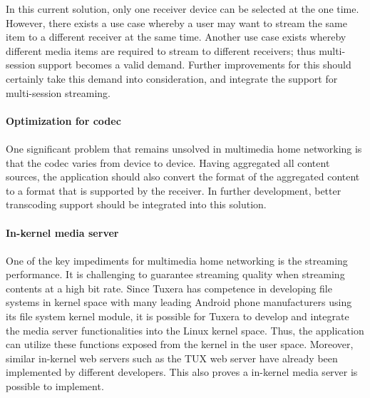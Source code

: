 In this current solution, only one receiver device can be selected at the one
time. However, there exists a use case whereby a user may want to stream the
same item to a different receiver at the same time. Another use case exists
whereby different media items are required to stream to different receivers;
thus multi-session support becomes a valid demand. Further improvements
for this should certainly take this demand into consideration, and integrate the
support for multi-session streaming.\\
\\
\textbf{Optimization for codec}\\
\\
One significant problem that remains unsolved in multimedia home networking is
that the codec varies from device to device. Having aggregated all content
sources, the application should also convert the format of the aggregated
content to a format that is supported by the receiver. In further development,
better transcoding support should be integrated into this solution.\\
\\
\textbf{In-kernel media server}\\
\\
One of the key impediments for multimedia home networking is the streaming
performance. It is challenging to guarantee streaming quality when streaming
contents at a high bit rate. Since Tuxera has competence in developing file
systems in kernel space with many leading Android phone manufacturers using its
file system kernel module, it is possible for Tuxera to develop and integrate
the media server functionalities into the Linux kernel space. Thus, the
application can utilize these functions exposed from the kernel in the user
space. Moreover, similar in-kernel web servers such as the TUX web server
\cite{tux_webserver} have already been implemented by different developers.
This also proves a in-kernel media server is possible to implement.
